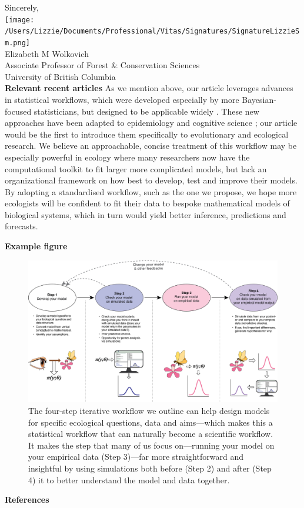 \documentclass[11pt]{article}
\begin{document}
Sincerely,\\

\texttt{[image: /Users/Lizzie/Documents/Professional/Vitas/Signatures/SignatureLizzieSm.png]} \\

Elizabeth M Wolkovich\\
Associate Professor of Forest \& Conservation Sciences\\ 
University of British Columbia\\

{\bf Relevant recent articles}
As we mention above, our article leverages advances in statistical workflows, which were developed especially by more Bayesian-focused statisticians,  but designed to be applicable widely \citep{betanworkflow,gelman2020bayesian}. These new approaches have been adapted to epidemiology and cognitive science  \citep{grinsztajn2021,schad2021}; our article would be the first to introduce them specifically to evolutionary and ecological research. We believe an approachable, concise treatment of this workflow may be especially powerful in ecology where many researchers now have the computational toolkit to fit larger more complicated models, but lack an organizational framework on how best to develop, test and improve their models. By adopting a standardised workflow, such as the one we propose, we hope more ecologists will be confident to fit their data to bespoke mathematical models of biological systems, which in turn would yield better inference, predictions and forecasts. 

\newpage
{\bf Example figure}

\begin{figure}[ht]
\centering
\noindent \includegraphics[width=1\textwidth]{..//figures/workflow.png}
\caption{The four-step iterative workflow we outline can help design models for specific ecological questions, data and aims---which makes this a statistical workflow that can naturally become a scientific workflow. It makes the step that many of us focus on---running your model on your empirical data (Step 3)---far more straightforward and insightful by using simulations both before (Step 2) and after (Step 4) it to better understand the model and data together.}
\label{fig:workflow}
\end{figure}

\newpage
{\bf References}
\vspace{-4ex}

\end{document}
